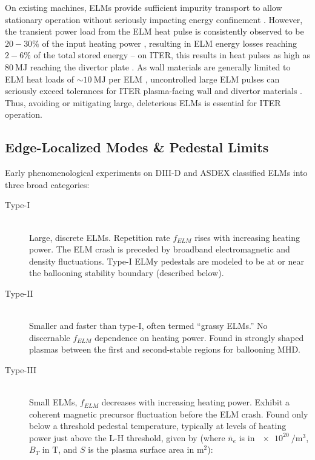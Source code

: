 On existing machines, ELMs provide sufficient impurity transport to allow stationary operation without seriously impacting energy confinement \cite{Rice1999}.  However, the transient power load from the ELM heat pulse is consistently observed to be $20-30\%$ of the input heating power \cite{Suttrop2003}, resulting in ELM energy losses reaching $2-6\%$ of the total stored energy -- on ITER, this results in heat pulses as high as $\SI{80}{\mega\joule}$ reaching the divertor plate \cite{Leonard1999,Suttrop2000}.  As wall materials are generally limited to ELM heat loads of $\sim \SI{10}{\mega\joule}$ per ELM \cite{Federici2003}, uncontrolled large ELM pulses can seriously exceed tolerances for ITER plasma-facing wall and divertor materials \cite{Loarte2003,Federici2003}.  Thus, avoiding or mitigating large, deleterious ELMs is essential for ITER operation.

\subsection{Edge-Localized Modes \& Pedestal Limits}\label{subsec:hcr_elmy_fluct}

Early phenomenological experiments on DIII-D and ASDEX \cite{Zohm1996,Connor1998,Suttrop2000} classified ELMs into three broad categories:

\begin{description}
 \item[Type-I] \hfill \\
 Large, discrete ELMs.  Repetition rate $f_{ELM}$ rises with increasing heating power.  The ELM crash is preceded by broadband electromagnetic and density fluctuations.  Type-I ELMy pedestals are modeled to be at or near the ballooning stability boundary (described below).
 \item[Type-II] \hfill \\
 Smaller and faster than type-I, often termed ``grassy ELMs.''  No discernable $f_{ELM}$ dependence on heating power.  Found in strongly shaped plasmas between the first and second-stable regions for ballooning MHD.
 \item[Type-III] \hfill \\
 Small ELMs, $f_{ELM}$ decreases with increasing heating power.  Exhibit a coherent magnetic precursor fluctuation before the ELM crash.  Found only below a threshold pedestal temperature, typically at levels of heating power just above the L-H threshold, given by \cite{Martin2008} (where $\overline{n}_e$ is in $\SI{e20}{\per\meter\cubed}$, $B_T$ in $\si{\tesla}$, and $S$ is the plasma surface area in $\si{\meter\squared}$):
\end{description}

